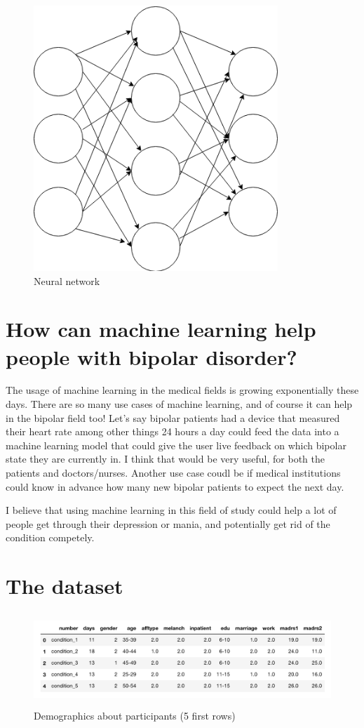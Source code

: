 \begin{figure}
    \includegraphics[height=10cm]{neural_net.png}
    \caption{Neural network}
    \label{figure:neural_net}
\end{figure}

\newpage
\section{How can machine learning help people with bipolar disorder?}
The usage of machine learning in the medical fields is growing exponentially these days. There are so many use cases of machine learning, and of course 
it can help in the bipolar field too! Let's say bipolar patients had a device that measured their heart rate among other things 24 hours a day could 
feed the data into a machine learning model that could give the user live feedback on which bipolar state they are currently in. I think that would be very 
useful, for both the patients and doctors/nurses. Another use case coudl be if medical institutions could know in advance how many new bipolar patients to 
expect the next day. 

I believe that using machine learning in this field of study could help a lot of people get through their depression or mania, and potentially get rid 
of the condition competely.

\section{The dataset}

\begin{figure}
    \begin{center}
        \includegraphics[height=3.5cm]{img/demographics.png}
        \caption{Demographics about participants (5 first rows)}
        \label{figure:demographics}
    \end{center}
\end{figure}

